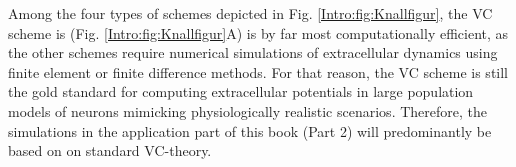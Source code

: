 Among the four types of schemes depicted in Fig. \ref{Intro:fig:Knallfigur}, the VC scheme is (Fig. \ref{Intro:fig:Knallfigur}A) is by far most computationally efficient, as the other schemes require numerical simulations of extracellular dynamics using finite element or finite difference methods. For that reason, the VC scheme is still the gold standard for computing extracellular potentials in large population models of neurons mimicking physiologically realistic scenarios. Therefore, the simulations in the application part of this book (Part 2) will predominantly be based on on standard VC-theory.

